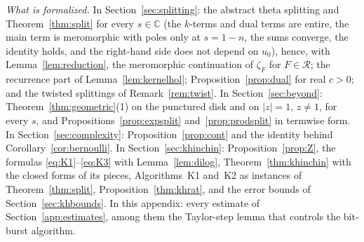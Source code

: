 \documentclass[11pt,reqno]{amsart}
\theoremstyle{definition}
\theoremstyle{remark}
\newcommand{\Reg}{\mathcal{R}}
\newcommand{\CC}{\mathbb{C}}
\begin{document}
\emph{What is formalized.} In Section~\ref{sec:splitting}: the abstract theta splitting and Theorem~\ref{thm:split} for
every $s \in \CC$ (the $k$-terms and dual terms are entire, the main term is meromorphic with poles only at
$s = 1 - n$, the sums converge, the identity holds, and the right-hand side does not depend on $u_0$), hence, with
Lemma~\ref{lem:reduction}, the meromorphic continuation of $\zeta_F$ for $F \in \Reg$; the recurrence part of
Lemma~\ref{lem:kernelhol}; Proposition~\ref{prop:dual} for real $c > 0$; and the twisted splittings of
Remark~\ref{rem:twist}. In Section~\ref{sec:beyond}: Theorem~\ref{thm:geometric}(1) on the punctured disk and on
$|z| = 1$, $z \ne 1$, for every $s$, and Propositions~\ref{prop:expsplit} and~\ref{prop:prodsplit} in termwise form. In Section~\ref{sec:complexity}:
Proposition~\ref{prop:cont} and the identity behind Corollary~\ref{cor:bernoulli}. In Section~\ref{sec:khinchin}:
Proposition~\ref{prop:Z}, the formulas \eqref{eq:K1}--\eqref{eq:K3} with Lemma~\ref{lem:dilog}, Theorem~\ref{thm:khinchin}
with the closed forms of its pieces, Algorithms~K1 and~K2 as instances of Theorem~\ref{thm:split},
Proposition~\ref{thm:khrat}, and the error bounds of Section~\ref{sec:khbounds}. In this appendix: every estimate of
Section~\ref{app:estimates}, among them the Taylor-step lemma that controls the bit-burst algorithm.
\end{document}
